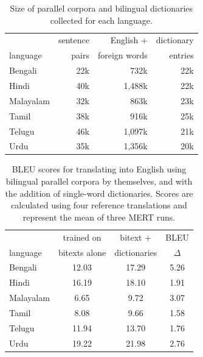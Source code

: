 \documentclass[11pt]{article}
\begin{document}
\begin{table}[t]
  \centering
  \small
  \begin{tabular}{l|rrr}
    		 & sentence   &  English + & dictionary  \\
    language &  pairs  & foreign words &  entries \\
    \hline\hline
    Bengali & 22k & 732k   & 22k \\
    Hindi   &  40k & 1,488k & 22k \\
    Malayalam & 32k & 863k & 23k \\
    Tamil & 38k & 916k & 25k \\
    Telugu & 46k & 1,097k & 21k \\
    Urdu & 35k & 1,356k & 20k \\
  \end{tabular}
  \caption{Size of parallel corpora and bilingual dictionaries collected for each language. }
  \label{table:data-size}
\end{table}

\begin{table}[t]
\centering
  \small
\begin{tabular}{l|cc|c}
  		  & trained on  &  bitext + & BLEU \\
  language  & bitexts alone &  dictionaries & $\Delta$ \\
  \hline\hline
  Bengali    &  12.03 & 17.29 & 5.26 \\
  Hindi      & 16.19 & 18.10 & 1.91 \\  
  Malayalam    &  6.65 & 9.72 & 3.07 \\      
  Tamil      & 8.08 & 9.66 & 1.58 \\  
  Telugu     & 11.94 & 13.70 & 1.76 \\  
  Urdu        & 19.22 & 21.98 & 2.76 \\   
\end{tabular}
\caption{BLEU scores for translating into English using bilingual parallel corpora by themselves, and with the addition of single-word dictionaries. Scores are calculated using four reference translations and represent the mean of three MERT runs.}
\label{dictionary_bleu}
\end{table}
\end{document}
